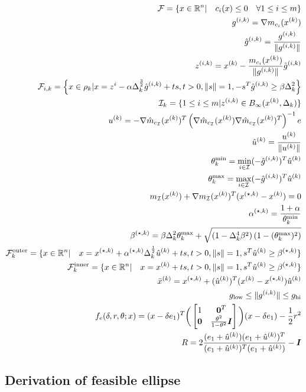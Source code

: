 \begin{align*}
{\mathcal F} = \{x \in {\mathbb R^{n}} | \quad c_i(x) \le 0\quad \forall 1 \le i \le m \} \\
{g^{(i, k)}} = \nabla m_{c_i}({x^{(k)}}) \\ 
{{\hat g}^{(i, k)}} = \frac{{g^{(i, k)}}}{\|{g^{(i, k)}}\|} \\
{z^{(i, k)}} = {x^{(k)}} - \frac{m_{c_i}({x^{(k)}})}{\|{g^{(i, k)}}\|}{{\hat g}^{(i, k)}} \\
{\mathcal F_{i, k}} = \left\{x \in \rho_k | x = z^i - \alpha \Delta_k^{\frac 3 2}{{\hat g}^{(i, k)}} + t s,t > 0, \|s\| = 1, -s^T{{\hat g}^{(i, k)}} \ge \beta \Delta_k^2\right\} \\
{\mathcal I_{k}} = \{1\le i \le m | {z^{(i, k)}} \in B_{\infty}({x^{(k)}}, \Delta_k) \} \\
{u^{(k)}} = -\nabla \hat m_{c_{\mathcal I}}({x^{(k)}})^T\left(\nabla \hat m_{c_{\mathcal I}}({x^{(k)}})\nabla \hat m_{c_{\mathcal I}}({x^{(k)}})^T\right)^{-1} e\\
{{\hat u}^{(k)}} = \frac {{u^{(k)}}} {\| {u^{(k)}}\|}\\
\theta^{\text{min}}_k = \min_{i \in \mathcal I} (-{{\hat g}^{(i, k)}})^T {{\hat u}^{(k)}} \\
\theta^{\text{max}}_k = \max_{i \in \mathcal I} (-{{\hat g}^{(i, k)}})^T {{\hat u}^{(k)}} \\
m_{\mathcal I}({x^{(k)}}) + \nabla m_{\mathcal I}({x^{(k)}})^T ({x^{(\star, k)}} - {x^{(k)}}) = 0 \\
{\alpha^{(\star, k)}} = \frac{1 + \alpha}{\theta^{\text{min}}_k} \\
{\beta^{(\star, k)}} = \beta\Delta_k^2 \theta^{\text{max}}_k + \sqrt{(1 - \Delta_k^4\beta^2)\left(1 - (\theta^{\text{max}}_k) ^2\right)} \\
{\mathcal {F}^{\text{outer}}_k} = \{x \in {\mathbb R^{n}} | \quad x = {x^{(\star, k)}} + {\alpha^{(\star, k)}}\Delta_k^{\frac 1 2}{{\hat u}^{(k)}} + ts, t > 0, \|s\| = 1, s^T{{\hat u}^{(k)}} \ge {\beta^{(\star, k)}} \} \\
{\mathcal {F}^{\text{inner}}_k} = \{x \in {\mathbb R^{n}} | \quad x = {x^{(k)}} + ts, t > 0, \|s\| = 1, s^T{{\hat u}^{(k)}} \ge {\beta^{(\star, k)}} \} \\
{\bar{x}^{(k)}} = {x^{(\star, k)}} + ({{\hat u}^{(k)}})^T({x^{(k)}} - {x^{(\star, k)}}){{\hat u}^{(k)}}\\
g_{\text{low}} \le \|{g^{(i, k)}}\| \le g_{\text{hi}} \\
f_e(\delta, r, \theta; x) = (x - \delta e_1)^T\bigg(\begin{bmatrix}
1 & \boldsymbol0^T \\
\boldsymbol 0 & \frac{\theta^2}{1 - \theta^2} \boldsymbol I \\
\end{bmatrix}\bigg)(x - \delta e_1) - \frac 1 2 r^2 \\
R = 2\frac{(e_1 + {{\hat u}^{(k)}})(e_1 + {{\hat u}^{(k)}})^T}{(e_1 + {{\hat u}^{(k)}})^T(e_1 + {{\hat u}^{(k)}})} - \boldsymbol I \\
\end{align*}

\subsection{Derivation of feasible ellipse}


